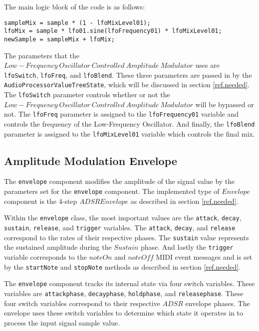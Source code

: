 \documentclass[a4paper,12pt]{report}
\begin{document}
The main logic block of the code is as follows:
\begin{lstlisting}
sampleMix = sample * (1 - lfoMixLevel01);
lfoMix = sample * lfo01.sine(lfoFrequency01) * lfoMixLevel01;
newSample = sampleMix + lfoMix;
\end{lstlisting}

The parameters that the $Low-Frequency\ Oscillator\ Controlled\ Amplitude\ Modulator$ uses are \texttt{lfoSwitch}, \texttt{lfoFreq}, and \texttt{lfoBlend}. These three parameters are passed in by the \texttt{AudioProcessorValueTreeState}, which will be discussed in section \ref{ref.needed}. The \texttt{lfoSwitch} parameter controls whether or not the $Low-Frequency\ Oscillator\ Controlled\ Amplitude\ Modulator$ will be bypassed or not. The \texttt{lfoFreq} parameter is assigned to the \texttt{lfoFrequency01} variable and controls the frequency of the Low-Frequency Oscillator. And finally, the \texttt{lfoBlend} parameter is assigned to the \texttt{lfoMixLevel01} variable which controls the final mix.

\subsection{Amplitude Modulation Envelope}
The \texttt{envelope} component modifies the amplitude of the signal value by the parameters set for the \texttt{envelope} component. The implemented type of $Envelope$ component is the 4-step $ADSR Envelope$ as described in section \ref{ref.needed}. 

Within the \texttt{envelope} class, the most important values are the \texttt{attack}, \texttt{decay}, \texttt{sustain}, \texttt{release}, and \texttt{trigger} variables. The \texttt{attack}, \texttt{decay}, and \texttt{release} correspond to the rates of their respective phases. The \texttt{sustain} value represents the sustained amplitude during the $Sustain$ phase. And lastly the \texttt{trigger} variable corresponds to the $noteOn$ and $noteOff$ MIDI event messages and is set by the \texttt{startNote} and \texttt{stopNote} methods as described in section \ref{ref.needed}.

The \texttt{envelope} component tracks its internal state via four switch variables. These variables are \texttt{attackphase}, \texttt{decayphase}, \texttt{holdphase}, and \texttt{releasephase}. These four switch variables correspond to their respective $ADSR$ envelope phases. The envelope uses these switch variables to determine which state it operates in to process the input signal sample value. 
\end{document}
